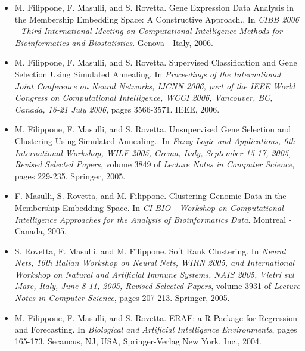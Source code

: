 \begin{itemize}
\item  M. Filippone, F. Masulli, and S. Rovetta. Gene Expression Data Analysis in the Membership Embedding Space: A Constructive Approach.. In \emph{CIBB 2006 - Third International Meeting on Computational Intelligence Methods for Bioinformatics and Biostatistics}. Genova - Italy, 2006.
\item  M. Filippone, F. Masulli, and S. Rovetta. Supervised Classification and Gene Selection Using Simulated Annealing. In \emph{Proceedings of the International Joint Conference on Neural Networks, IJCNN 2006, part of the IEEE World Congress on Computational Intelligence, WCCI 2006, Vancouver, BC, Canada, 16-21 July 2006}, pages 3566-3571. IEEE, 2006.
\item  M. Filippone, F. Masulli, and S. Rovetta. Unsupervised Gene Selection and Clustering Using Simulated Annealing.. In \emph{Fuzzy Logic and Applications, 6th International Workshop, WILF 2005, Crema, Italy, September 15-17, 2005, Revised Selected Papers}, volume 3849 of \emph{Lecture Notes in Computer Science}, pages 229-235. Springer, 2005.
\item  F. Masulli, S. Rovetta, and M. Filippone. Clustering Genomic Data in the Membership Embedding Space. In \emph{CI-BIO - Workshop on Computational Intelligence Approaches for the Analysis of Bioinformatics Data}. Montreal - Canada, 2005.
\item  S. Rovetta, F. Masulli, and M. Filippone. Soft Rank Clustering. In \emph{Neural Nets, 16th Italian Workshop on Neural Nets, WIRN 2005, and International Workshop on Natural and Artificial Immune Systems, NAIS 2005, Vietri sul Mare, Italy, June 8-11, 2005, Revised Selected Papers}, volume 3931 of \emph{Lecture Notes in Computer Science}, pages 207-213. Springer, 2005.
\item  M. Filippone, F. Masulli, and S. Rovetta. {ERAF}: a {R} Package for Regression and Forecasting. In \emph{Biological and Artificial Intelligence Environments}, pages 165-173. Secaucus, NJ, USA, Springer-Verlag New York, Inc., 2004.
\end{itemize}

